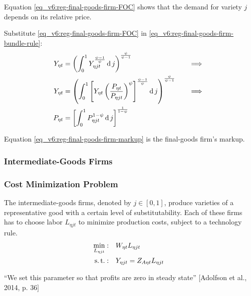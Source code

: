\documentclass[../thesis.tex]{subfiles}
\begin{document}
Equation \ref{eq_v6:reg-final-goods-firm-FOC} shows that the demand for variety $j$ depends on its relative price. 

Substitute \ref{eq_v6:reg-final-goods-firm-FOC} in \ref{eq_v6:reg-final-goods-firm-bundle-rule}:
\begin{alignat}{2}
	Y_{\eta t} & = \left( \int_{0}^{1} Y_{\eta jt}^{\frac{\psi-1}{\psi}} \operatorname{d} j \right)^{\frac{\psi}{\psi-1}} &\implies \nonumber \\
	Y_{\eta t} & = \left( \int_{0}^{1} \left[ Y_{\eta t} \left( \frac{P_{\eta t}}{P_{\eta jt}} \right)^{\psi} \right]^{\frac{\psi-1}{\psi}} \operatorname{d} j \right)^{\frac{\psi}{\psi-1}} \quad &\implies \nonumber \\
	P_{\eta t} & = \left[ \int_{0}^{1} P_{\eta jt}^{1-\psi} \operatorname{d} j \right]^{\frac{1}{1-\psi}} \label{eq_v6:reg-final-goods-firm-markup}
\end{alignat}

Equation \ref{eq_v6:reg-final-goods-firm-markup} is the final-goods firm's markup.


\subsubsection{Intermediate-Goods Firms}

\subsubsection*{Cost Minimization Problem}

The intermediate-goods firms, denoted by $j \in [0,1]$, produce varieties of a representative good with a certain level of substitutability. Each of these firms has to choose labor $L_{\eta jt}$ to minimize production costs, subject to a technology rule.
\begin{align}
	\label{eq_v6:reg-int-good-firm-total-cost}
	\min_{L_{\eta jt}}: \quad & W_{\eta t} L_{\eta jt} \\
	\label{eq_v6:reg-int-good-firm-production-function}
	\operatorname{s.t.}: \quad & Y_{\eta jt} = Z_{A\eta t} L_{\eta jt}
\end{align}

\begin{tcolorbox}[colback=red!5!white,colframe=red!75!black]
	
	“We set this parameter so that profits are zero in steady state” [Adolfson et al., 2014, p. 36]
	
\end{tcolorbox}
\end{document}
